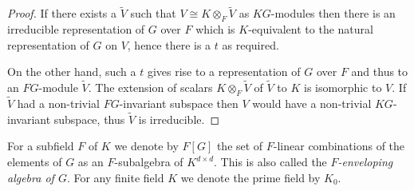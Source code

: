 \begin{proof}
If there exists a $\tilde{V}$ such that $V \cong K \otimes_{F} \tilde{V}$ as
$KG$-modules then there is an irreducible representation of
$G$ over $F$ which is $K$-equivalent to the natural representation of $G$ on $V$,
 hence there is a $t$ as required.

On the other hand, such a $t$ 
gives rise to a representation of $G$ over $F$ and thus to an $FG$-module
$\tilde{V}$. The extension of scalars $K \otimes_F \tilde V$ of 
$\tilde{V}$ to $K$ is isomorphic
to $V$. If $\tilde{V}$ had a non-trivial $FG$-invariant subspace then
$V$ would have a non-trivial $KG$-invariant subspace, thus $\tilde{V}$
is irreducible.
\end{proof}

For a subfield $F$ of $K$ we denote by $F[G]$ the set of $F$-linear
combinations of the elements of $G$ as an $F$-subalgebra of $K^{d \times d}$.
This is also called the \emph{$F$-enveloping algebra of $G$}. For any finite field $K$ we denote the prime field by $K_0$. 


